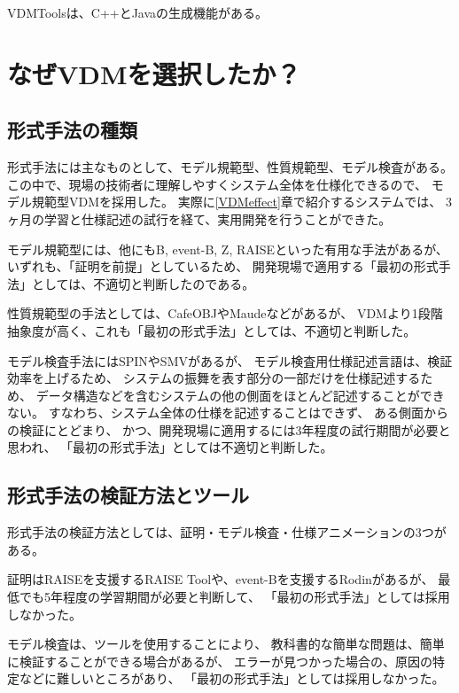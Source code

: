 VDMToolsは、C++とJavaの生成機能がある。

\section{なぜVDMを選択したか？}
	\label{WhyVDM}

\subsection{形式手法の種類}

形式手法には主なものとして、モデル規範型、性質規範型、モデル検査がある。
この中で、現場の技術者に理解しやすくシステム全体を仕様化できるので、
モデル規範型VDMを採用した。
実際に\ref{VDMeffect}章で紹介するシステムでは、
3ヶ月の学習と仕様記述の試行を経て、実用開発を行うことができた。

モデル規範型には、他にもB, event-B, Z, RAISEといった有用な手法があるが、
いずれも、「証明を前提」としているため、
開発現場で適用する「最初の形式手法」としては、不適切と判断したのである。

性質規範型の手法としては、CafeOBJやMaudeなどがあるが、
VDMより1段階抽象度が高く、これも「最初の形式手法」としては、不適切と判断した。

モデル検査手法にはSPINやSMVがあるが、
モデル検査用仕様記述言語は、検証効率を上げるため、
システムの振舞を表す部分の一部だけを仕様記述するため、
データ構造などを含むシステムの他の側面をほとんど記述することができない。
すなわち、システム全体の仕様を記述することはできず、
ある側面からの検証にとどまり、
かつ、開発現場に適用するには3年程度の試行期間が必要と思われ、
「最初の形式手法」としては不適切と判断した。

\subsection{形式手法の検証方法とツール}

形式手法の検証方法としては、証明・モデル検査・仕様アニメーションの3つがある。

証明はRAISEを支援するRAISE Toolや、event-Bを支援するRodinがあるが、
最低でも5年程度の学習期間が必要と判断して、
「最初の形式手法」としては採用しなかった。

モデル検査は、ツールを使用することにより、
教科書的な簡単な問題は、簡単に検証することができる場合があるが、
エラーが見つかった場合の、原因の特定などに難しいところがあり、
「最初の形式手法」としては採用しなかった。

